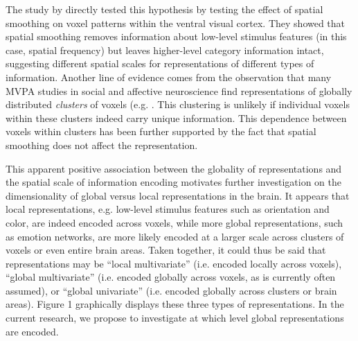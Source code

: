 \documentclass[12pt,a4paper]{article}\usepackage[]{graphicx}\usepackage[]{color}
\begin{document}
The study by \cite{brants2011} directly tested this hypothesis by testing the effect of spatial smoothing on voxel patterns within the ventral visual cortex. They showed that spatial smoothing removes information about low-level stimulus features (in this case, spatial frequency) but leaves higher-level category information intact, suggesting different spatial scales for representations of different types of information. Another line of evidence comes from the observation that many MVPA studies in social and affective neuroscience find representations of globally distributed \emph{clusters} of voxels (e.g. \citealp{oosterwijk2015,kassam2013,corradi2014}. This clustering is unlikely if individual voxels within these clusters indeed carry unique information. This dependence between voxels within clusters has been further supported by the fact that spatial smoothing \citep{oosterwijk2015,kassam2013} does not affect the representation.

This apparent positive association between the globality of representations and the spatial scale of information encoding motivates further investigation on the dimensionality of global versus local representations in the brain. It appears that local representations, e.g. low-level stimulus features such as orientation and color, are indeed encoded across voxels, while more global representations, such as emotion networks, are more likely encoded at a larger scale across clusters of voxels or even entire brain areas. Taken together, it could thus be said that representations may be ``local multivariate'' (i.e. encoded locally across voxels), ``global multivariate'' (i.e. encoded globally across voxels, as is currently often assumed), or ``global univariate'' (i.e. encoded globally across clusters or brain areas). Figure 1 graphically displays these three types of representations. In the current research, we propose to investigate at which level global representations are encoded.
\end{document}
